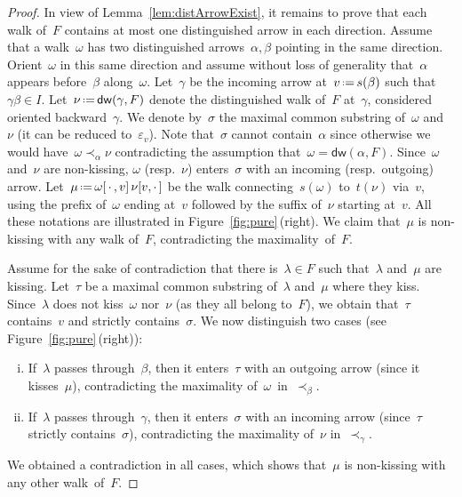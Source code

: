 \documentclass{amsart}
\theoremstyle{definition}
\newcommand{\eqdef}{\mbox{\,\raisebox{0.2ex}{\scriptsize\ensuremath{\mathrm:}}\ensuremath{=}\,}} %
\newcommand{\fref}[1]{Figure~\ref{#1}} %
\newcommand{\blossom}{^\text{\ding{96}}} %
\newcommand{\distinguishedWalk}[2]{\mathsf{dw}(#1,#2)} %
\begin{document}
\begin{proof}
In view of Lemma~\ref{lem:distArrowExist}, it remains to prove that each walk of~$F$ contains at most one distinguished arrow in each direction.
Assume that a walk~$\omega$ has two distinguished arrows~$\alpha, \beta$ pointing in the same direction.
Orient~$\omega$ in this same direction and assume without loss of generality that~$\alpha$ appears before~$\beta$ along~$\omega$.
Let~$\gamma$ be the incoming arrow at~$v \eqdef s(\beta)$ such that~$\gamma\beta \in I$.
Let~$\nu \eqdef \distinguishedWalk{\gamma}{F}$ denote the distinguished walk of~$F$ at~$\gamma$, considered oriented backward~$\gamma$.
We denote by~$\sigma$ the maximal common substring of~$\omega$ and~$\nu$ (it can be reduced to~$\varepsilon_v$).
Note that~$\sigma$ cannot contain~$\alpha$ since otherwise we would have~$\omega \prec_\alpha \nu$ contradicting the assumption that~$\omega = \distinguishedWalk{\alpha}{F}$. 
Since~$\omega$ and~$\nu$ are non-kissing, $\omega$ (resp.~$\nu$) enters~$\sigma$ with an incoming (resp.~outgoing) arrow.
Let~$\mu \eqdef \omega[\,\cdot\,, v] \, \nu[v, \cdot\,]$ be the walk connecting~$s(\omega)$ to~$t(\nu)$ via~$v$, using the prefix of~$\omega$ ending at~$v$ followed by the suffix of~$\nu$ starting at~$v$.
All these notations are illustrated in \fref{fig:pure}\,(right).
We claim that~$\mu$ is non-kissing with any walk of~$F$, contradicting the maximality~of~$F$.

Assume for the sake of contradiction that there is~$\lambda \in F$ such that~$\lambda$ and~$\mu$ are kissing.
Let~$\tau$ be a maximal common substring of~$\lambda$ and~$\mu$ where they kiss.
Since~$\lambda$ does not kiss~$\omega$ nor~$\nu$ (as they all belong to~$F$), we obtain that~$\tau$ contains~$v$ and strictly contains~$\sigma$.
We now distinguish two cases (see \fref{fig:pure}\,(right)):
\begin{enumerate}[(i)]
\item If~$\lambda$ passes through~$\beta$, then it enters~$\tau$ with an outgoing arrow (since it kisses~$\mu$), contradicting the maximality of~$\omega$~in~$\prec_\beta$.
\item If~$\lambda$ passes through~$\gamma$, then it enters~$\sigma$ with an incoming arrow (since~$\tau$ strictly contains~$\sigma$), contradicting the maximality of~$\nu$ in~$\prec_\gamma$. 
\end{enumerate}
We obtained a contradiction in all cases, which shows that~$\mu$ is non-kissing with any other walk~of~$F$.


\end{proof}
\end{document}
